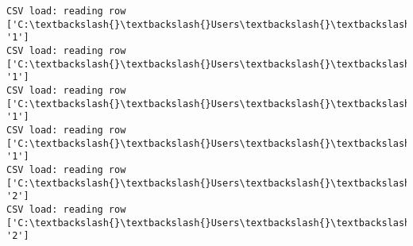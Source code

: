 \documentclass[11pt]{article}
\begin{document}
\begin{Verbatim}[commandchars=\\\{\}]
CSV load: reading row ['C:\textbackslash{}\textbackslash{}Users\textbackslash{}\textbackslash{}AbhishekGangadhar\textbackslash{}\textbackslash{}Downloads\textbackslash{}\textbackslash{}ActionRecog\textbackslash{}\textbackslash{}ActionRecog\textbackslash{}\textbackslash{}DataSets\textbackslash{}\textbackslash{}UCF11\textbackslash{}\textbackslash{}action\_youtube\_naudio\textbackslash{}\textbackslash{}golf\_swing\textbackslash{}\textbackslash{}v\_golf\_14\textbackslash{}\textbackslash{}v\_golf\_14\_01.avi', '1']
CSV load: reading row ['C:\textbackslash{}\textbackslash{}Users\textbackslash{}\textbackslash{}AbhishekGangadhar\textbackslash{}\textbackslash{}Downloads\textbackslash{}\textbackslash{}ActionRecog\textbackslash{}\textbackslash{}ActionRecog\textbackslash{}\textbackslash{}DataSets\textbackslash{}\textbackslash{}UCF11\textbackslash{}\textbackslash{}action\_youtube\_naudio\textbackslash{}\textbackslash{}golf\_swing\textbackslash{}\textbackslash{}v\_golf\_14\textbackslash{}\textbackslash{}v\_golf\_14\_02.avi', '1']
CSV load: reading row ['C:\textbackslash{}\textbackslash{}Users\textbackslash{}\textbackslash{}AbhishekGangadhar\textbackslash{}\textbackslash{}Downloads\textbackslash{}\textbackslash{}ActionRecog\textbackslash{}\textbackslash{}ActionRecog\textbackslash{}\textbackslash{}DataSets\textbackslash{}\textbackslash{}UCF11\textbackslash{}\textbackslash{}action\_youtube\_naudio\textbackslash{}\textbackslash{}golf\_swing\textbackslash{}\textbackslash{}v\_golf\_14\textbackslash{}\textbackslash{}v\_golf\_14\_03.avi', '1']
CSV load: reading row ['C:\textbackslash{}\textbackslash{}Users\textbackslash{}\textbackslash{}AbhishekGangadhar\textbackslash{}\textbackslash{}Downloads\textbackslash{}\textbackslash{}ActionRecog\textbackslash{}\textbackslash{}ActionRecog\textbackslash{}\textbackslash{}DataSets\textbackslash{}\textbackslash{}UCF11\textbackslash{}\textbackslash{}action\_youtube\_naudio\textbackslash{}\textbackslash{}golf\_swing\textbackslash{}\textbackslash{}v\_golf\_14\textbackslash{}\textbackslash{}v\_golf\_14\_04.avi', '1']
CSV load: reading row ['C:\textbackslash{}\textbackslash{}Users\textbackslash{}\textbackslash{}AbhishekGangadhar\textbackslash{}\textbackslash{}Downloads\textbackslash{}\textbackslash{}ActionRecog\textbackslash{}\textbackslash{}ActionRecog\textbackslash{}\textbackslash{}DataSets\textbackslash{}\textbackslash{}UCF11\textbackslash{}\textbackslash{}action\_youtube\_naudio\textbackslash{}\textbackslash{}trampoline\_jumping\textbackslash{}\textbackslash{}v\_jumping\_06\textbackslash{}\textbackslash{}v\_jumping\_06\_01.avi', '2']
CSV load: reading row ['C:\textbackslash{}\textbackslash{}Users\textbackslash{}\textbackslash{}AbhishekGangadhar\textbackslash{}\textbackslash{}Downloads\textbackslash{}\textbackslash{}ActionRecog\textbackslash{}\textbackslash{}ActionRecog\textbackslash{}\textbackslash{}DataSets\textbackslash{}\textbackslash{}UCF11\textbackslash{}\textbackslash{}action\_youtube\_naudio\textbackslash{}\textbackslash{}trampoline\_jumping\textbackslash{}\textbackslash{}v\_jumping\_06\textbackslash{}\textbackslash{}v\_jumping\_06\_02.avi', '2']

\end{Verbatim}
\end{document}
